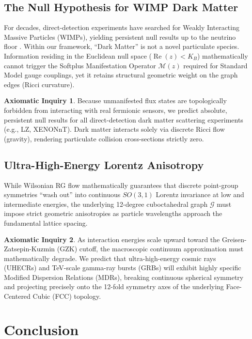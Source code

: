 \documentclass[11pt, letterpaper]{article}
\DeclareMathOperator{\ReOp}{Re}
\theoremstyle{definition}
\newtheorem{inquiry}{Axiomatic Inquiry}[section]
\theoremstyle{remark}
\begin{document}
\subsection{The Null Hypothesis for WIMP Dark Matter}
For decades, direct-detection experiments have searched for Weakly Interacting Massive Particles (WIMPs), yielding persistent null results up to the neutrino floor \cite{Aprile2018}. Within our framework, ``Dark Matter'' is not a novel particulate species. Information residing in the Euclidean null space ($\ReOp(z) < K_B$) mathematically cannot trigger the Softplus Manifestation Operator $\mathcal{M}(z)$ required for Standard Model gauge couplings, yet it retains structural geometric weight on the graph edges (Ricci curvature).
\begin{inquiry}
Because unmanifested flux states are topologically forbidden from interacting with real fermionic sensors, we predict absolute, persistent null results for all direct-detection dark matter scattering experiments (e.g., LZ, XENONnT). Dark matter interacts solely via discrete Ricci flow (gravity), rendering particulate collision cross-sections strictly zero.
\end{inquiry}

\subsection{Ultra-High-Energy Lorentz Anisotropy}
While Wilsonian RG flow mathematically guarantees that discrete point-group symmetries ``wash out'' into continuous $SO(3,1)$ Lorentz invariance at low and intermediate energies, the underlying 12-degree cuboctahedral graph $\mathcal{G}$ must impose strict geometric anisotropies as particle wavelengths approach the fundamental lattice spacing.
\begin{inquiry}
As interaction energies scale upward toward the Greisen-Zatsepin-Kuzmin (GZK) cutoff, the macroscopic continuum approximation must mathematically degrade. We predict that ultra-high-energy cosmic rays (UHECRs) and TeV-scale gamma-ray bursts (GRBs) will exhibit highly specific Modified Dispersion Relations (MDRs), breaking continuous spherical symmetry and projecting precisely onto the 12-fold symmetry axes of the underlying Face-Centered Cubic (FCC) topology.
\end{inquiry}

\section{Conclusion}
\end{document}
